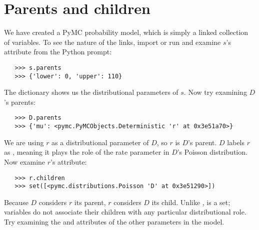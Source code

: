 \section*{Parents and children}

We have created a PyMC probability model, which is simply a linked collection of variables. To see the nature of the links, import or run  and examine $s$'s  attribute from the Python prompt:
\begin{verbatim}
   >>> s.parents
   >>> {'lower': 0, 'upper': 110}
\end{verbatim}
The  dictionary shows us the distributional parameters of $s$. Now try examining $D$'s parents:
\begin{verbatim}
   >>> D.parents
   >>> {'mu': <pymc.PyMCObjects.Deterministic 'r' at 0x3e51a70>}
\end{verbatim}
We are using $r$ as a distributional parameter of $D$, so $r$ is $D$'s parent. $D$ labels $r$ as , meaning it plays the role of the rate parameter in $D$'s Poisson distribution. Now examine $r$'s  attribute:
\begin{verbatim}
   >>> r.children
   >>> set([<pymc.distributions.Poisson 'D' at 0x3e51290>])
\end{verbatim}
Because $D$ considers $r$ its parent, $r$ considers $D$ its child. Unlike ,  is a set; variables do not associate their children with any particular distributional role. Try examining the  and  attributes of the other parameters in the model.

\begin{center}
\end{center}

